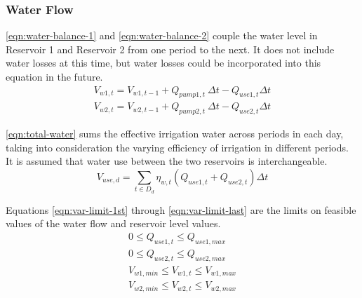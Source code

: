 \subsubsection{Water Flow}

\autoref{eqn:water-balance-1} and \autoref{eqn:water-balance-2} couple the water level in Reservoir 1 and Reservoir 2 from one period to the next. It does not include water losses at this time, but water losses could be incorporated into this equation in the future.
%
\begin{gather}
\label{eqn:water-balance-1}
V_{w1,t} = V_{w1,t-1} + Q_{pump1,t} \ \Delta t - Q_{use1,t} \Delta t \\
\label{eqn:water-balance-2}
V_{w2,t} = V_{w2,t-1} + Q_{pump2,t} \ \Delta t - Q_{use2,t} \Delta t
\end{gather}

\autoref{eqn:total-water} sums the effective irrigation water across periods in each day, taking into consideration the varying efficiency of irrigation in different periods.
It is assumed that water use between the two reservoirs is interchangeable.
%
\begin{equation}
\label{eqn:total-water}
V_{use,d} = \sum_{t \in D_d}  \eta_{w,t} \left( Q_{use1,t} +  Q_{use2,t} \right) \Delta t
\end{equation}

Equations \ref{eqn:var-limit-1st} through \ref{eqn:var-limit-last} are the limits on feasible values of the water flow and reservoir level values.
%
\begin{gather}
\label{eqn:var-limit-1st}
0 \le Q_{use1,t} \le Q_{use1,max} \\
0 \le Q_{use2,t} \le Q_{use2,max} \\
V_{w1,min} \le V_{w1,t} \le V_{w1,max} \\
\label{eqn:var-limit-last}
V_{w2,min} \le V_{w2,t} \le V_{w2,max}
\end{gather}


